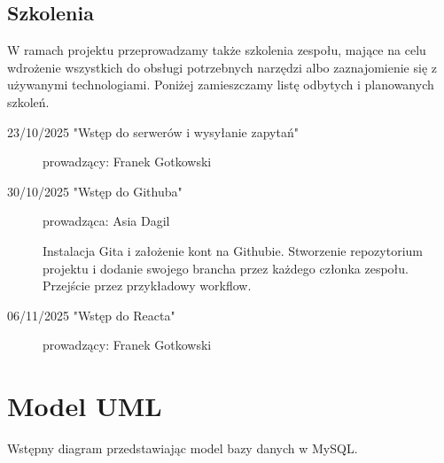 \documentclass[]{report}
\begin{document}
\subsection{Szkolenia}

W ramach projektu przeprowadzamy także szkolenia zespołu, mające na celu wdrożenie wszystkich do obsługi potrzebnych narzędzi albo zaznajomienie się z używanymi technologiami. Poniżej zamieszczamy listę odbytych i planowanych szkoleń.

\begin{description}
    \item[23/10/2025 "Wstęp do serwerów i wysyłanie zapytań"]
    
        prowadzący: Franek Gotkowski
        
    \item[30/10/2025 "Wstęp do Githuba"]
    
        prowadząca: Asia Dagil

        Instalacja Gita i założenie kont na Githubie. Stworzenie repozytorium projektu i dodanie swojego brancha przez każdego członka zespołu. Przejście przez przykładowy workflow.

    \item[06/11/2025 "Wstęp do Reacta"]
    
        prowadzący: Franek Gotkowski
\end{description}


\newpage
\section{Model UML}

Wstępny diagram przedstawiając model bazy danych w MySQL.
\vspace{3ex}

\end{document}
